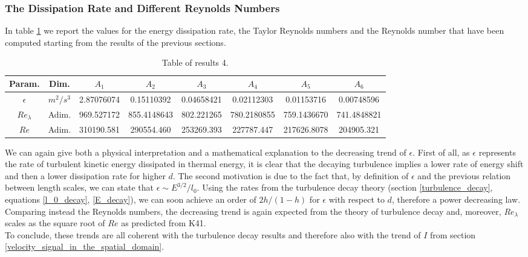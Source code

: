 \documentclass[11pt,titlepage]{article}
\begin{document}
\subsubsection{The Dissipation Rate and Different Reynolds Numbers}
In table \ref{tab4} we report the values for the energy dissipation rate, the Taylor Reynolds numbers and the Reynolds number that have been computed starting from the results of the previous sections. \\

\begin{table}[h!]
\centering
\caption{Table of results 4.} \label{tab4}
    \begin{tabular}{ | c | c | c | c | c | c | c | c |}
        \hline
        Param. & Dim. & $A_1$ & $A_2$ & $A_3$ & $A_4$ & $A_5$ & $A_6$ \\
        \hline
        $\epsilon$ & $m^2/s^3$&2.87076074& 0.15110392& 0.04658421& 0.02112303& 0.01153716 &0.00748596  \\
        \hline
        $Re_\lambda$ & Adim. & 969.527172 & 855.4148643& 802.221265 & 780.2180855& 759.1436670&
        741.4848821 \\
        \hline
        $Re$& Adim. &310190.581 & 290554.460& 253269.393 &227787.447&
        217626.8078 &204905.321 \\
        \hline
    \end{tabular}
\end{table}
We can again give both a physical interpretation and a mathematical explanation to the decreasing trend of $\epsilon$. First of all, as $\epsilon$ represents the rate of turbulent kinetic energy dissipated in thermal energy, it is clear that the decaying turbulence implies a lower rate of energy shift and then a lower dissipation rate for higher $d$. The second motivation is due to the fact that, by definition of $\epsilon$ and the previous relation between length scales, we can state that $\epsilon \sim E^{3/2}/l_0$. Using the rates from the turbulence decay theory (section \ref{turbulence_decay}, equations \ref{l_0_decay}, \ref{E_decay}), we can soon achieve an order of $2h/(1-h)$ for $\epsilon$ with respect to $d$, therefore a power decreasing law. \\
Comparing instead the Reynolds numbers, the decreasing trend is again expected from the theory of turbulence decay and, moreover, $Re_{\lambda}$ scales as the square root of $Re$ as predicted from K41. \\
To conclude, these trends are all coherent with the turbulence decay results and therefore also with the trend of $I$ from section \ref{velocity_signal_in_the_spatial_domain}.
\end{document}
